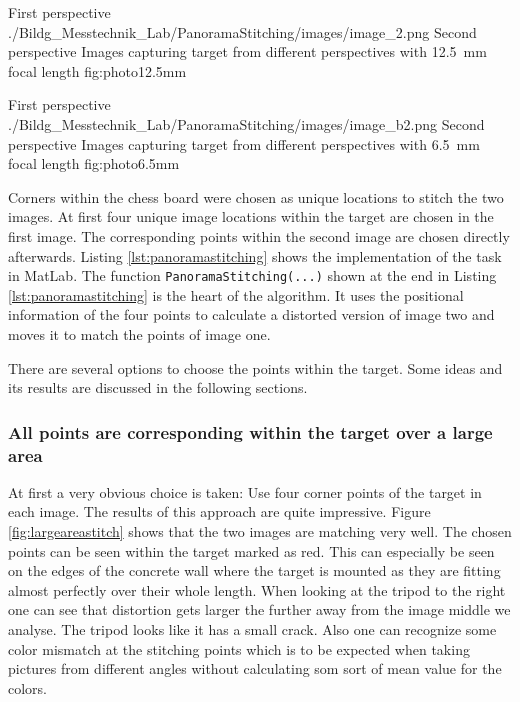 \documentclass[
a4paper,     %
11pt         %
]{scrartcl}  %
\begin{document}
{First perspective}
{./Bildg_Messtechnik_Lab/PanoramaStitching/images/image_2.png}
{Second perspective}
{Images capturing target from different perspectives with \SI{12.5}{mm} focal length}
{fig:photo12.5mm}

{First perspective}
{./Bildg_Messtechnik_Lab/PanoramaStitching/images/image_b2.png}
{Second perspective}
{Images capturing target from different perspectives with \SI{6.5}{mm} focal length}
{fig:photo6.5mm}

Corners within the chess board were chosen as unique locations to stitch the two images.
At first four unique image locations within the target are chosen in the first image.
The corresponding points within the second image are chosen directly afterwards.
Listing \ref{lst:panoramastitching} shows the implementation of the task in MatLab.
The function \lstinline{PanoramaStitching(...)} shown at the end in Listing \ref{lst:panoramastitching} is the heart of the algorithm.
It uses the positional information of the four points to calculate a distorted version of image two and moves it to match the points of image one.



There are several options to choose the points within the target.
Some ideas and its results are discussed in the following sections.

\subsubsection{All points are corresponding within the target over a large area}

At first a very obvious choice is taken: Use four corner points of the target in each image.
The results of this approach are quite impressive.
Figure \ref{fig:largeareastitch} shows that the two images are matching very well.
The chosen points can be seen within the target marked as red.
This can especially be seen on the edges of the concrete wall where the target is mounted as they are fitting almost perfectly over their whole length.
When looking at the tripod to the right one can see that distortion gets larger the further away from the image middle we analyse.
The tripod looks like it has a small crack.
Also one can recognize some color mismatch at the stitching points which is to be expected when taking pictures from different angles without calculating som sort of mean value for the colors.
\end{document}

